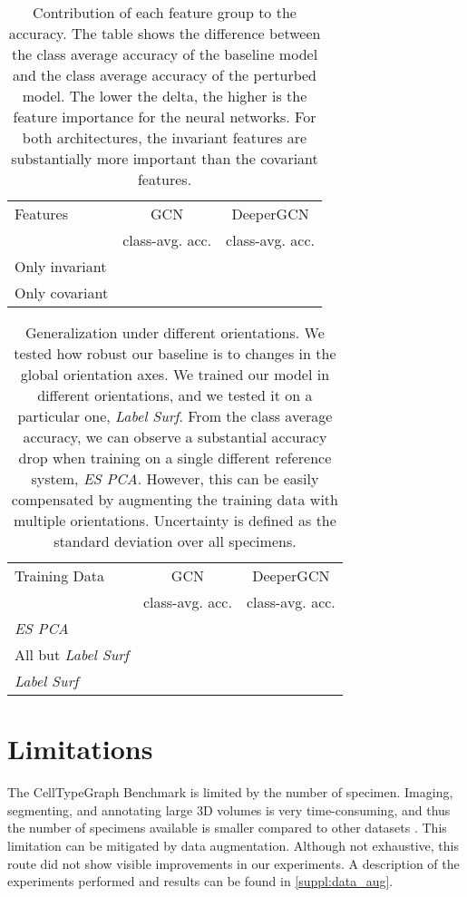 \documentclass[10pt,twocolumn,letterpaper]{article}
\begin{document}
\begin{table}
  \centering
  \begin{tabular}{@{}lcc@{}}
    \toprule
    Features & GCN                      & DeeperGCN \\
             &  class-avg. acc. &  class-avg. acc. \\
    \midrule
    Only invariant     &  &   \\
    Only covariant     &  &   \\
    \bottomrule
  \end{tabular}
  \caption{Contribution of each feature group to the accuracy. The table shows the difference between the class average accuracy of the baseline model and the class average accuracy of the perturbed model. The lower the delta, the higher is the feature importance for the neural networks. For both architectures, the invariant features are substantially more important than the covariant features.}
  \label{tab:features_importance}
\end{table}

\begin{table}
  \centering
  \begin{tabular}{@{}lcc@{}}
    \toprule
    Training Data & GCN & DeeperGCN \\
                  & class-avg. acc.      & class-avg. acc.  \\
    \midrule
    \textit{ES PCA}             &  &  \\
    All but \textit{Label Surf} &  &  \\
    \textit{Label Surf}         &  &  \\
    \bottomrule
  \end{tabular}
  \caption{Generalization under different orientations. We tested how robust our baseline is to changes in the global orientation axes. We trained our model in different orientations, and we tested it on a particular one, \textit{Label Surf}. From the class average accuracy, we can observe a substantial accuracy drop when training on a single different reference system, \textit{ES PCA}. However, this can be easily compensated by augmenting the training data with multiple orientations. Uncertainty is defined as the standard deviation over all specimens.}
  \label{tab:generalization}
\end{table}

\section{Limitations}
\label{sec:limitations}
The CellTypeGraph Benchmark is limited by the number of specimen. Imaging, segmenting, and annotating large 3D volumes is very time-consuming, and thus the number of specimens available is smaller compared to other datasets \cite{wu2018moleculenet, gomez2018automatic}. This limitation can be mitigated by data augmentation. Although not exhaustive, this route did not show visible improvements in our experiments. A description of the experiments performed and results can be found in \cref{suppl:data_aug}.
\end{document}
